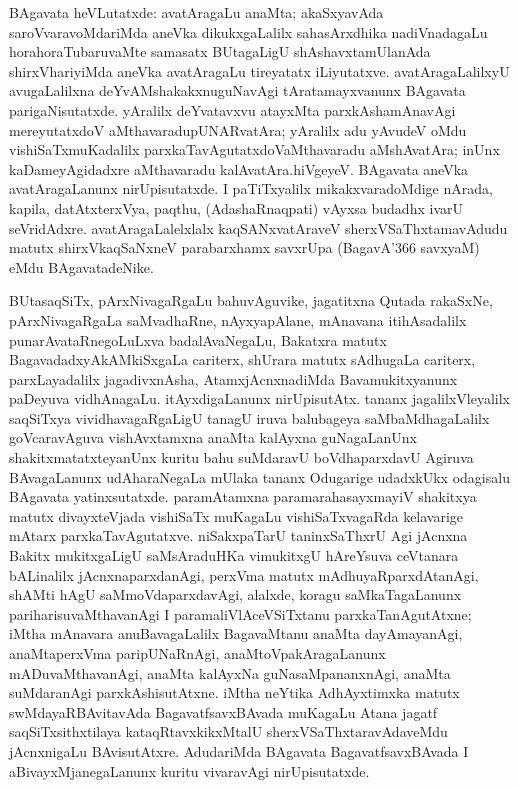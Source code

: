 BAgavata heVLutatxde: avatAragaLu anaMta; akaSxyavAda saroVvaravoMda\-riMda aneVka dikukxgaLalilx sahasArxdhika nadiVnadagaLu horahoraTubaruvaMte samasatx BUta\break\-gaLigU shAshavxtamUlanAda shirxVhariyiMda aneVka avatAragaLu tireyatatx iLiyutatxve. avatAragaLalilxyU avugaLalilxna deYvAMshakakxnuguNavAgi tAratamayxvanunx BAgavata parigaNisutatxde. yAralilx deYvatavxvu atayxMta parxkAshamAnavAgi mereyutatxdoV aMthavaradu\break pUNARvatAra; yAralilx adu yAvudeV oMdu vishiSaTxmuKadalilx parxkaTavAgu\-tatxdoV\break aMthavaradu aMshAvatAra; inUnx kaDameyAgidadxre aMthavaradu kalAvatAra.\break hiVgeyeV. BAgavata aneVka avatAragaLanunx nirUpisutatxde. I paTiTxyalilx mikakxvara\-doMdige nArada, kapila, datAtxterxVya, paqthu, (AdashaRnaqpati) vAyxsa budadhx ivarU seVridAdxre. avatAragaLalelxlalx kaqSANxvatAraveV sherxVSaThxtamavAdudu matutx shirxVkaqSaNxneV para\-barxhamx savxrUpa (BagavA\char'366 savxyaM) eMdu BAgavatadeNike. 

BUtasaqSiTx, pArxNivagaRgaLu bahuvAguvike, jagatitxna Qutada rakaSxNe, pArxNivagaR\-gaLa saMvadhaRne, nAyxyapAlane, mAnavana itihAsadalilx punarAvataRnegoLuLxva badalA\-vaNegaLu, Bakatxra matutx BagavadadxyAkAMkiSxgaLa cariterx, shUrara matutx sAdhugaLa cariterx, parxLayadalilx jagadivxnAsha, AtamxjAcnxnadiMda Bavamukitxyanunx paDeyuva vidhAnagaLu. itAyxdigaLanunx nirUpisutAtx. tananx jagalilxVleyalilx saqSiTxya vividhavagaRgaLigU tanagU iruva balubageya saMbaMdhagaLalilx goVcaravAguva vishAvxtamxna anaMta kalAyxna guNagaLanUnx shakitxmatatxteyanUnx kuritu bahu suMdaravU boVdhaparxdavU Agiruva BAvagaLanunx udAharaNegaLa mUlaka tananx Odugarige udadxkUkx odagisalu BAgavata yatinxsutatxde. paramAtamxna paramarahasayxmayiV shakitxya matutx divayxteVjada vishiSaTx muKagaLu vishiSaTxvagaRda kelavarige mAtarx parxkaTavAgutatxve. niSakxpaTarU taninxSaThxrU Agi jAcnxna Bakitx mukitxgaLigU saMsAraduHKa vimukitxgU hAreYsuva ceVtanara bALinalilx jAcnxnaparxdanAgi, perxVma matutx mAdhuyaRparxdAtanAgi, shAMti hAgU saMmoVdaparxdavAgi, alalxde, koragu saMkaTagaLanunx pariharisuvaMthavanAgi I paramaliVlAceVSiTxtanu parxkaTanAgutAtxne; iMtha mAnavara anuBavagaLalilx BagavaMtanu anaMta dayAmayanAgi, anaMtaperxVma paripUNaRnAgi, anaMtoVpakAragaLanunx mADuvaMthavanAgi, anaMta kalAyxNa guNasaMpananxnAgi, anaMta suMdaranAgi parxkAshisutAtxne. iMtha neYtika AdhAyxtimxka matutx swMdayaRBAvitavAda BagavatfsavxBAvada muKagaLu Atana jagatf saqSiTxsithxtilaya kataqRtavxkikxMtalU sherxVSaThxtaravAdaveMdu jAcnxnigaLu BAvisutAtxre. AdudariMda BAgavata BagavatfsavxBAvada I aBivayxMjanegaLanunx kuritu vivaravAgi nirUpisutatxde.

